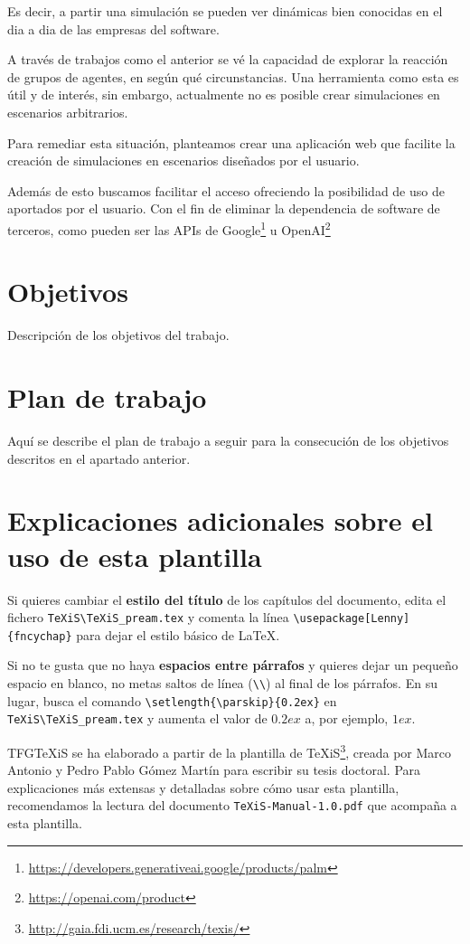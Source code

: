 Es decir, a partir una simulación se pueden ver dinámicas bien conocidas en el dia a dia de las empresas del software.

A través de trabajos como el anterior se vé la capacidad de explorar la reacción de grupos de agentes, en según qué circunstancias.
Una herramienta como esta es útil y de interés, sin embargo, actualmente no es posible crear simulaciones en escenarios arbitrarios.

Para remediar esta situación, planteamos crear una aplicación web que facilite la creación de simulaciones en escenarios diseñados por el usuario.

Además de esto buscamos facilitar el acceso ofreciendo la posibilidad de uso de \mgl aportados por el usuario. Con el fin de eliminar la dependencia de software de terceros, como pueden ser las APIs de Google\footnote{\url{https://developers.generativeai.google/products/palm}} u OpenAI\footnote{\url{https://openai.com/product}}


\section{Objetivos}
Descripción de los objetivos del trabajo.


\section{Plan de trabajo}
Aquí se describe el plan de trabajo a seguir para la consecución de los objetivos descritos en el apartado anterior.



\section{Explicaciones adicionales sobre el uso de esta plantilla}
Si quieres cambiar el \textbf{estilo del título} de los capítulos del documento, edita el fichero \verb|TeXiS\TeXiS_pream.tex| y comenta la línea \verb|\usepackage[Lenny]{fncychap}| para dejar el estilo básico de \LaTeX.

Si no te gusta que no haya \textbf{espacios entre párrafos} y quieres dejar un pequeño espacio en blanco, no metas saltos de línea (\verb|\\|) al final de los párrafos. En su lugar, busca el comando  \verb|\setlength{\parskip}{0.2ex}| en \verb|TeXiS\TeXiS_pream.tex| y aumenta el valor de $0.2ex$ a, por ejemplo, $1ex$.

TFGTeXiS se ha elaborado a partir de la plantilla de TeXiS\footnote{\url{http://gaia.fdi.ucm.es/research/texis/}}, creada por Marco Antonio y Pedro Pablo Gómez Martín para escribir su tesis doctoral. Para explicaciones más extensas y detalladas sobre cómo usar esta plantilla, recomendamos la lectura del documento \texttt{TeXiS-Manual-1.0.pdf} que acompaña a esta plantilla.

